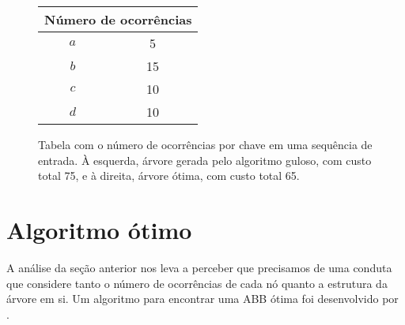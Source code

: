 \begin{figure}[h]
\centering
\begin{minipage}[c]{0.35\textwidth}
  \centering
  \begin{tabular}{|c|c|}
  \hline
  \multicolumn{2}{|c|}{\textbf{Número de ocorrências}} \\
  \hline
  \textbf{$a$} & 5 \\
  $b$ & 15 \\
  $c$ & 10 \\
  $d$ & 10 \\
  \hline
  \end{tabular}
  \end{minipage}
\begin{minipage}[c]{0.3\textwidth}
\centering
{}
\end{minipage}
\begin{minipage}[c]{0.3\textwidth}
\centering
{}
\end{minipage}
\caption{Tabela com o número de ocorrências por chave em uma sequência de entrada. À esquerda, árvore gerada pelo algoritmo guloso, com custo total 75, e à direita, árvore ótima, com custo total 65.}
\label{fig:caso-guloso-subotimo}
\end{figure}

\section{Algoritmo ótimo}

A análise da seção anterior nos leva a perceber que precisamos de uma conduta que considere tanto o número de ocorrências de cada nó quanto a estrutura da árvore em si. Um algoritmo para encontrar uma ABB ótima foi desenvolvido por \cite{knuth}.

